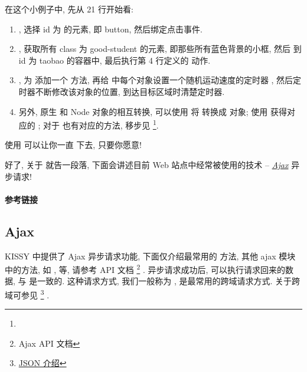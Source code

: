 \documentclass[letterpaper,10pt,english]{sphinxmanual}
\begin{document}
在这个小例子中, 先从 21 行开始看:
\begin{enumerate}
\item {}
, 选择 id 为  的元素, 即 button, 然后绑定点击事件.

\item {}
, 获取所有 class 为 good-student 的元素, 即那些所有蓝色背景的小框, 然后  到 id 为 taobao 的容器中, 最后执行第 4 行定义的  动作.

\item {}
, 为  添加一个  方法, 再给  中每个对象设置一个随机运动速度的定时器 , 然后定时器不断修改该对象的位置, 到达目标区域时清楚定时器.

\item {}
另外, 原生  和 Node 对象的相互转换, 可以使用  将  转换成  对象; 使用  获得对应的 ; 对于  也有对应的方法, 移步见 \footnote{
}.

\end{enumerate}

使用  可以让你一直  下去, 只要你愿意!

好了, 关于  就告一段落, 下面会讲述目前 Web 站点中经常被使用的技术 -- {\hyperref[quickstart/ajax:quickstart-ajax]{\emph{Ajax}}} 异步请求!
\paragraph{参考链接}


\subsection{Ajax}
\label{quickstart/ajax:quickstart-ajax}\label{quickstart/ajax:ajax}\label{quickstart/ajax::doc}
KISSY 中提供了 Ajax 异步请求功能, 下面仅介绍最常用的 {\hyperref[api/seed/loader/getScript:Loader.KISSY.getScript]{}} 方法, 其他 ajax 模块中的方法, 如 ,  等, 请参考 API 文档 \footnote{
Ajax API 文档
} .
 异步请求成功后, 可以执行请求回来的数据, 与  是一致的.
这种请求方式, 我们一般称为 , 是最常用的跨域请求方式. 关于跨域可参见 \footnote{
\href{http://en.wikipedia.org/wiki/JSON}{JSON 介绍}
} .
\end{document}

